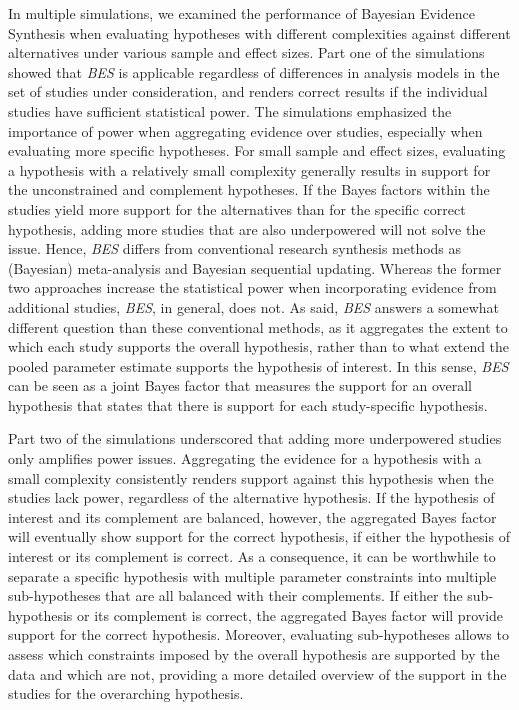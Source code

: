 \documentclass[
]{interact}
\begin{document}
In multiple simulations, we examined the performance of Bayesian
Evidence Synthesis when evaluating hypotheses with different
complexities against different alternatives under various sample and
effect sizes. Part one of the simulations showed that \emph{BES} is
applicable regardless of differences in analysis models in the set of
studies under consideration, and renders correct results if the
individual studies have sufficient statistical power. The simulations
emphasized the importance of power when aggregating evidence over
studies, especially when evaluating more specific hypotheses. For small
sample and effect sizes, evaluating a hypothesis with a relatively small
complexity generally results in support for the unconstrained and
complement hypotheses. If the Bayes factors within the studies yield
more support for the alternatives than for the specific correct
hypothesis, adding more studies that are also underpowered will not
solve the issue. Hence, \emph{BES} differs from conventional research
synthesis methods as (Bayesian) meta-analysis and Bayesian sequential
updating. Whereas the former two approaches increase the statistical
power when incorporating evidence from additional studies, \emph{BES},
in general, does not. As said, \emph{BES} answers a somewhat different
question than these conventional methods, as it aggregates the extent to
which each study supports the overall hypothesis, rather than to what
extend the pooled parameter estimate supports the hypothesis of
interest. In this sense, \emph{BES} can be seen as a joint Bayes factor
that measures the support for an overall hypothesis that states that
there is support for each study-specific hypothesis.

Part two of the simulations underscored that adding more underpowered
studies only amplifies power issues. Aggregating the evidence for a
hypothesis with a small complexity consistently renders support against
this hypothesis when the studies lack power, regardless of the
alternative hypothesis. If the hypothesis of interest and its complement
are balanced, however, the aggregated Bayes factor will eventually show
support for the correct hypothesis, if either the hypothesis of interest
or its complement is correct. As a consequence, it can be worthwhile to
separate a specific hypothesis with multiple parameter constraints into
multiple sub-hypotheses that are all balanced with their complements. If
either the sub-hypothesis or its complement is correct, the aggregated
Bayes factor will provide support for the correct hypothesis. Moreover,
evaluating sub-hypotheses allows to assess which constraints imposed by
the overall hypothesis are supported by the data and which are not,
providing a more detailed overview of the support in the studies for the
overarching hypothesis.
\end{document}
